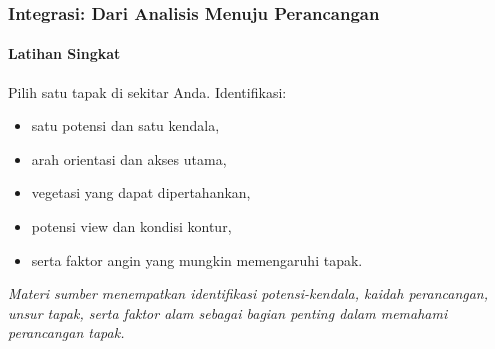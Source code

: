 \documentclass[../main.tex]{subfiles}
\begin{document}
\begin{frame}[mytitle=standard, c, mycolor=digiPH_darkblue, dark]
	\frametitle{Integrasi: Dari Analisis Menuju Perancangan}
	\framesubtitle{Latihan Singkat}

	Pilih satu tapak di sekitar Anda. Identifikasi:
	\begin{itemize}
		\item satu potensi dan satu kendala,
		\item arah orientasi dan akses utama,
		\item vegetasi yang dapat dipertahankan,
		\item potensi view dan kondisi kontur,
		\item serta faktor angin yang mungkin memengaruhi tapak.
	\end{itemize}

	\vspace{0.5cm}
	\scriptsize{\textit{Materi sumber menempatkan identifikasi potensi-kendala, kaidah perancangan, unsur tapak, serta faktor alam sebagai bagian penting dalam memahami perancangan tapak.}}
\end{frame}
\end{document}
